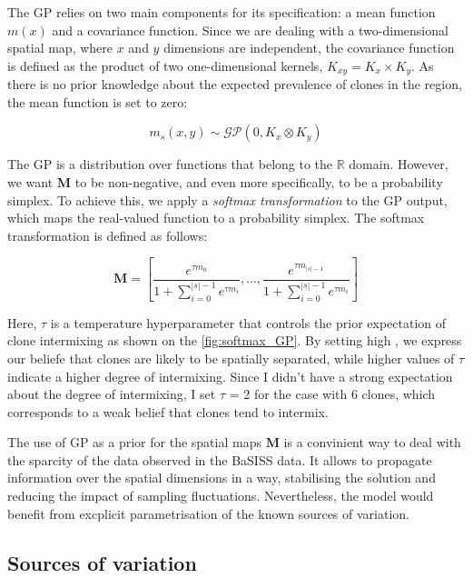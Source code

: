 The \ac{GP} relies on two main components for its specification: a mean function $m(x)$ and a covariance function. Since we are dealing with a two-dimensional spatial map, where $x$ and $y$ dimensions are independent, the covariance function is defined as the product of two one-dimensional kernels, $K_{xy} = K_x \times K_y$. As there is no prior knowledge about the expected prevalence of clones in the region, the mean function is set to zero:

\begin{equation}
    m_s(x,y) \sim \mathcal{GP}(0, K_x \otimes K_y)
\end{equation}

The \ac{GP} is a distribution over functions that belong to the $\mathbb{R}$ domain. However, 
we want $\mathbf{M}$ to be non-negative, and even more specifically, to be a probability simplex. To achieve this, we apply a \emph{softmax transformation} to the \ac{GP} output, which maps the real-valued function to a probability simplex. The softmax transformation is defined as follows:

\begin{equation}
    \mathbf{M} = \left[ \dfrac{e^{\tau m_0}}{1 + \sum_{i=0}^{|s|-1}{e^{\tau m_i}}}, \dots, \dfrac{e^{\tau m_{|s|-1}}}{1 + \sum_{i=0}^{|s|-1}{e^{\tau m_i}}} \right]
\end{equation}

Here, $\tau$ is a temperature hyperparameter that controls the prior expectation of clone intermixing as shown on the \cref{fig:softmax_GP}. By setting high , we express our beliefe that clones are likely to be spatially separated, while higher values of $\tau$ indicate a higher degree of intermixing. Since I didn't have a strong expectation about the degree of intermixing, I set $\tau$ = 2 for the case with 6 clones, which corresponds to a weak belief that clones tend to intermix.

The use of \ac{GP} as a prior for the spatial maps $\mathbf{M}$ is a convinient way to deal with the sparcity of the data observed in the \ac{BaSISS} data. It allows to propagate information over the spatial dimensions in a  way, stabilising the solution and reducing the impact of sampling fluctuations. Nevertheless, the model would benefit from excplicit parametrisation of the known sources of variation.

\subsection{Sources of variation}

